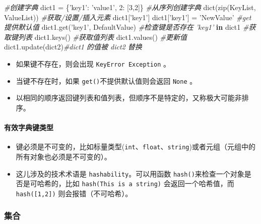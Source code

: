 \documentclass[utf-8]{ctexart}
\newenvironment{Shaded}{}{}
\newcommand{\KeywordTok}[1]{\textcolor[rgb]{0.00,0.44,0.13}{\textbf{#1}}}
\newcommand{\DecValTok}[1]{\textcolor[rgb]{0.25,0.63,0.44}{#1}}
\newcommand{\StringTok}[1]{\textcolor[rgb]{0.25,0.44,0.63}{#1}}
\newcommand{\CommentTok}[1]{\textcolor[rgb]{0.38,0.63,0.69}{\textit{#1}}}
\newcommand{\OperatorTok}[1]{\textcolor[rgb]{0.40,0.40,0.40}{#1}}
\newcommand{\BuiltInTok}[1]{#1}
\newcommand{\NormalTok}[1]{#1}
\let\oldparagraph\paragraph
\renewcommand{\paragraph}[1]{\oldparagraph{#1}\mbox{}}
\begin{document}
\begin{Shaded}
\begin{Highlighting}[]
\CommentTok{#创建字典}
\NormalTok{dict1 }\OperatorTok{=}\NormalTok{ \{}\StringTok{'key1'}\NormalTok{: }\StringTok{'value1'}\NormalTok{, }\DecValTok{2}\NormalTok{: [}\DecValTok{3}\NormalTok{,}\DecValTok{2}\NormalTok{]\}}
\CommentTok{#从序列创建字典}
\BuiltInTok{dict}\NormalTok{(}\BuiltInTok{zip}\NormalTok{(KeyList, ValueList))}
\CommentTok{#获取/设置/插入元素}
\NormalTok{dict1[}\StringTok{'key1'}\NormalTok{]}
\NormalTok{dict1[}\StringTok{'key1'}\NormalTok{] }\OperatorTok{=} \StringTok{'NewValue'}
\CommentTok{#get 提供默认值}
\NormalTok{dict1.get(}\StringTok{'key1'}\NormalTok{, DefaultValue)}
\CommentTok{#检查键是否存在}
\CommentTok{'key1'} \KeywordTok{in}\NormalTok{ dict1}
\CommentTok{#获取键列表}
\NormalTok{dict1.keys()}
\CommentTok{#获取值列表}
\NormalTok{dict1.values()}
\CommentTok{#更新值}
\NormalTok{dict1.update(dict2)}\CommentTok{#dict1 的值被 dict2 替换}
\end{Highlighting}
\end{Shaded}

\begin{itemize}
\item
  如果键不存在，则会出现 \texttt{KeyError\ Exception} 。
\item
  当键不存在时，如果 \texttt{get()}不提供默认值则会返回 \texttt{None} 。
\item
  以相同的顺序返回键列表和值列表，但顺序不是特定的，又称极大可能非排序。
\end{itemize}

\paragraph{有效字典键类型}\label{header-n186}

\begin{itemize}
\item
  键必须是不可变的，比如标量类型(\texttt{int}、\texttt{float}、\texttt{string})或者元组（元组中的所有对象也必须是不可变的）。
\item
  这儿涉及的技术术语是 \texttt{hashability}。可以用函数
  \texttt{hash()}来检查一个对象是否是可哈希的，比如
  \texttt{hash(\textquotesingle{}This\ is\ a\ string\textquotesingle{})}
  会返回一个哈希值，而 \texttt{hash({[}1,2{]})} 则会报错（不可哈希）。
\end{itemize}

\subsubsection{集合}\label{header-n194}
\end{document}
